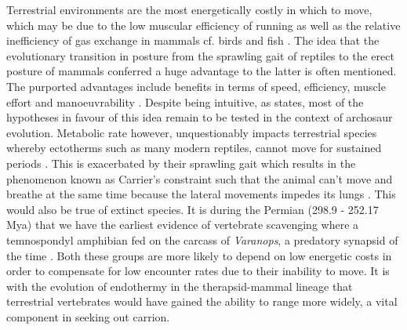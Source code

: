 \documentclass[a4paper,12pt]{article}
\begin{document}
Terrestrial environments are the most energetically costly in which to move, which may be due to the low muscular efficiency of running \citep{tucker1975energetic} as well as the relative inefficiency of gas exchange in mammals cf. birds and fish \citep{williams1999evolution}.
The idea that the evolutionary transition in posture from the sprawling gait of reptiles to the erect posture of mammals conferred a huge advantage to the latter is often mentioned.
The purported advantages include benefits in terms of speed, efficiency, muscle effort and manoeuvrability \citep{sullivan2015posture}. 
Despite being intuitive, as \cite{sullivan2015posture} states, most of the hypotheses in favour of this idea remain to be tested in the context of archosaur evolution. 
Metabolic rate however, unquestionably impacts terrestrial species whereby ectotherms such as many modern reptiles, cannot move for sustained periods \citep{bennett1979endothermy}. 
This is exacerbated by their sprawling gait which results in the phenomenon known as Carrier's constraint such that the animal can't move and breathe at the same time because the lateral movements impedes its lungs \citep{carrier1987evolution}. 
This would also be true of extinct species. 
It is during the Permian (298.9 - 252.17 Mya) that we have the earliest evidence of vertebrate scavenging where a temnospondyl amphibian fed on the carcass of \textit{Varanops}, a predatory synapsid of the time \citep{reisz2006articulated}. 
Both these groups are more likely to depend on low energetic costs in order to compensate for low encounter rates due to their inability to move. 
It is with the evolution of endothermy in the therapsid-mammal lineage \citep{clarke2010temperature} that terrestrial vertebrates would have gained the ability to range more widely, a vital component in seeking out carrion. 
\end{document}
